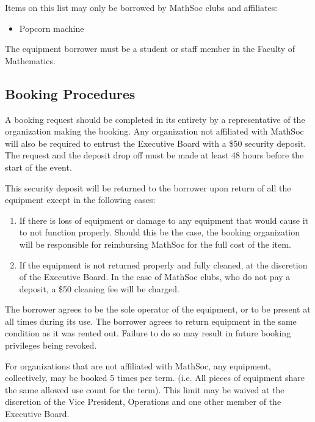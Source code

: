 Items on this list may only be borrowed by MathSoc clubs and affiliates:

\begin{itemize}
	\item Popcorn machine
\end{itemize}

The equipment borrower must be a student or staff member in the Faculty of Mathematics.

\subsection{Booking Procedures}

A booking request should be completed in its entirety by a
representative of the organization making the booking. Any organization not
affiliated with MathSoc will also be required to entrust the Executive Board
with a \$50 security deposit. The request and the deposit drop off must be made
at least 48 hours before the start of the event.

This security deposit will be returned to the borrower upon return of all the
equipment except in the following cases:

\begin{enumerate}
	\item If there is loss of equipment or damage to any equipment that would cause it to not function
	      properly. Should this be the case, the booking organization will be
	      responsible for reimbursing MathSoc for the full cost of the item.
	\item If the equipment is not returned properly and fully cleaned, at the
	      discretion of the Executive Board. In the case of MathSoc clubs, who do not
	      pay a deposit, a \$50 cleaning fee will be charged.
\end{enumerate}

The borrower agrees to be the sole operator of the equipment, or to be present
at all times during its use. The borrower agrees to return equipment in the same condition as it was rented out. Failure to do so may result in future booking privileges being revoked.

For organizations that are not affiliated with MathSoc, any equipment,
collectively, may be booked 5 times per term. (i.e. All pieces of equipment
share the same allowed use count for the term). This limit may be waived at the
discretion of the Vice President, Operations and one other member of the
Executive Board.

